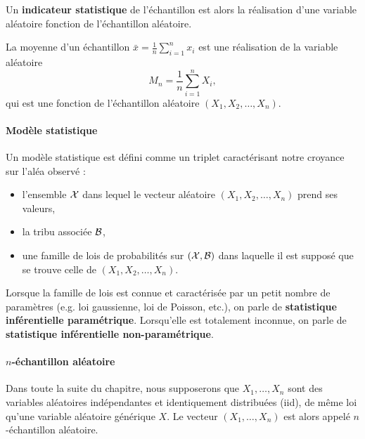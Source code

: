 Un \textbf{indicateur statistique} de l'échantillon est alors la réalisation d'une variable aléatoire fonction de l'échantillon aléatoire.

\begin{exemple} La moyenne d'un échantillon
	$\bar{x} = \frac1n \sum_{i=1}^n x_i$ est une réalisation de la variable
	aléatoire
	\[
	M_n = \frac1n \sum_{i=1}^n X_i,
	\]
	qui est une fonction de l'échantillon aléatoire $(X_1, X_2, \dots, X_n)$.
\end{exemple}


\paragraph{Modèle statistique} Un modèle statistique est défini comme un triplet caractérisant notre croyance sur l'aléa observé :
\begin{itemize}
	\item l'ensemble $\mathcal{X}$ dans lequel le vecteur aléatoire $(X_1, X_2, \dots, X_n)$ prend ses valeurs,
	\item la tribu associée $\mathcal{B}$,
	\item une famille de lois de probabilités sur $(\mathcal{X},\mathcal{B})$ dans laquelle il est supposé que se trouve celle de $(X_1, X_2, \dots, X_n)$.
\end{itemize}
Lorsque la famille de lois est connue et caractérisée par un petit nombre de paramètres (e.g. loi gaussienne, loi de Poisson, etc.), on parle de \textbf{statistique inférentielle paramétrique}. Lorsqu'elle est totalement
inconnue, on parle de \textbf{statistique inférentielle non-paramétrique}.

\paragraph{$n$-échantillon aléatoire}	Dans toute la suite du chapitre, nous supposerons que $X_1,\dots,X_n$ sont des variables aléatoires indépendantes et identiquement distribuées (iid), de même loi qu'une variable aléatoire générique $X$. Le vecteur $(X_1,\dots,X_n)$ est alors appelé $n$-échantillon aléatoire. 



